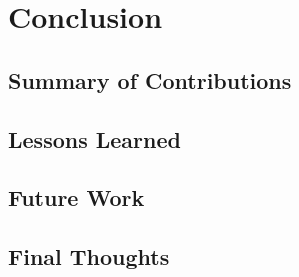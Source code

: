 \chapter{Conclusion}

\section{Summary of Contributions}

\section{Lessons Learned}

\section{Future Work}

\section{Final Thoughts}
